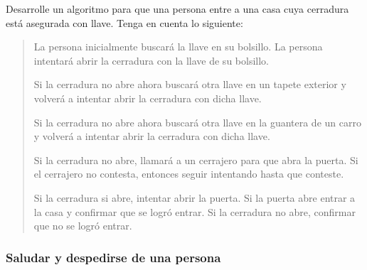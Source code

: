 \documentclass[letterpaper,10pt,spanish]{sphinxmanual}
\begin{document}
\sphinxAtStartPar
Desarrolle un algoritmo para que una persona entre a una casa cuya cerradura está asegurada con llave. Tenga en cuenta lo siguiente:
\begin{quote}

\sphinxAtStartPar
La persona inicialmente buscará la llave en su bolsillo. La persona intentará abrir la cerradura con la llave de su bolsillo.

\sphinxAtStartPar
Si la cerradura no abre ahora buscará otra llave en un tapete exterior y volverá a intentar abrir la cerradura con dicha llave.

\sphinxAtStartPar
Si la cerradura no abre ahora buscará otra llave en la guantera de un carro y volverá a intentar abrir la cerradura con dicha llave.

\sphinxAtStartPar
Si la cerradura no abre, llamará a un cerrajero para que abra la puerta. Si el cerrajero no contesta, entonces seguir intentando hasta que conteste.

\sphinxAtStartPar
Si la cerradura si abre, intentar abrir la puerta. Si la puerta abre entrar a la casa y confirmar que se logró entrar. Si la cerradura no abre, confirmar que no se logró entrar.
\end{quote}
\subsubsection*{Saludar y despedirse de una persona}
\end{document}
